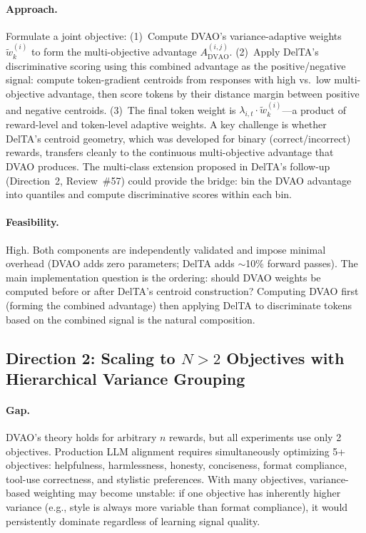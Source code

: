 \documentclass[11pt,a4paper]{article}
\begin{document}
\paragraph{Approach.}
Formulate a joint objective: (1)~Compute DVAO's variance-adaptive weights $\tilde{w}_k^{(i)}$ to form the multi-objective advantage $A_{\mathrm{DVAO}}^{(i,j)}$. (2)~Apply DelTA's discriminative scoring using this combined advantage as the positive/negative signal: compute token-gradient centroids from responses with high vs.\ low multi-objective advantage, then score tokens by their distance margin between positive and negative centroids. (3)~The final token weight is $\lambda_{i,t} \cdot \tilde{w}_k^{(i)}$---a product of reward-level and token-level adaptive weights. A key challenge is whether DelTA's centroid geometry, which was developed for binary (correct/incorrect) rewards, transfers cleanly to the continuous multi-objective advantage that DVAO produces. The multi-class extension proposed in DelTA's follow-up (Direction~2, Review~\#57) could provide the bridge: bin the DVAO advantage into quantiles and compute discriminative scores within each bin.

\paragraph{Feasibility.}
High. Both components are independently validated and impose minimal overhead (DVAO adds zero parameters; DelTA adds $\sim$10\% forward passes). The main implementation question is the ordering: should DVAO weights be computed before or after DelTA's centroid construction? Computing DVAO first (forming the combined advantage) then applying DelTA to discriminate tokens based on the combined signal is the natural composition.

\subsection*{Direction 2: Scaling to $N > 2$ Objectives with Hierarchical Variance Grouping}

\paragraph{Gap.}
DVAO's theory holds for arbitrary $n$ rewards, but all experiments use only 2 objectives. Production LLM alignment requires simultaneously optimizing 5+ objectives: helpfulness, harmlessness, honesty, conciseness, format compliance, tool-use correctness, and stylistic preferences. With many objectives, variance-based weighting may become unstable: if one objective has inherently higher variance (e.g., style is always more variable than format compliance), it would persistently dominate regardless of learning signal quality.
\end{document}
